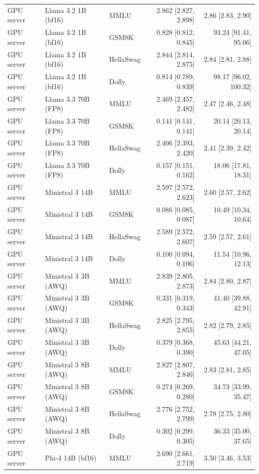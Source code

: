 \begin{longtable}{@{}l l l r r@{}}
GPU server & Llama 3.2 1B (bf16) & MMLU & 2.862 [2.827, 2.898] & 2.86 [2.83, 2.90] \\
GPU server & Llama 3.2 1B (bf16) & GSM8K & 0.828 [0.812, 0.845] & 93.24 [91.41, 95.06] \\
GPU server & Llama 3.2 1B (bf16) & HellaSwag & 2.844 [2.814, 2.875] & 2.84 [2.81, 2.88] \\
GPU server & Llama 3.2 1B (bf16) & Dolly & 0.814 [0.789, 0.839] & 98.17 [96.02, 100.32] \\
GPU server & Llama 3.3 70B (FP8) & MMLU & 2.469 [2.457, 2.482] & 2.47 [2.46, 2.48] \\
GPU server & Llama 3.3 70B (FP8) & GSM8K & 0.141 [0.141, 0.141] & 20.14 [20.13, 20.14] \\
GPU server & Llama 3.3 70B (FP8) & HellaSwag & 2.406 [2.393, 2.420] & 2.41 [2.39, 2.42] \\
GPU server & Llama 3.3 70B (FP8) & Dolly & 0.157 [0.151, 0.162] & 18.06 [17.81, 18.31] \\
GPU server & Ministral 3 14B & MMLU & 2.597 [2.572, 2.623] & 2.60 [2.57, 2.62] \\
GPU server & Ministral 3 14B & GSM8K & 0.086 [0.085, 0.087] & 10.49 [10.34, 10.64] \\
GPU server & Ministral 3 14B & HellaSwag & 2.589 [2.572, 2.607] & 2.59 [2.57, 2.61] \\
GPU server & Ministral 3 14B & Dolly & 0.100 [0.094, 0.106] & 11.54 [10.96, 12.13] \\
GPU server & Ministral 3 3B (AWQ) & MMLU & 2.839 [2.805, 2.873] & 2.84 [2.80, 2.87] \\
GPU server & Ministral 3 3B (AWQ) & GSM8K & 0.331 [0.319, 0.343] & 41.40 [39.88, 42.91] \\
GPU server & Ministral 3 3B (AWQ) & HellaSwag & 2.825 [2.795, 2.855] & 2.82 [2.79, 2.85] \\
GPU server & Ministral 3 3B (AWQ) & Dolly & 0.379 [0.368, 0.390] & 45.63 [44.21, 47.05] \\
GPU server & Ministral 3 8B (AWQ) & MMLU & 2.827 [2.807, 2.846] & 2.83 [2.81, 2.85] \\
GPU server & Ministral 3 8B (AWQ) & GSM8K & 0.274 [0.269, 0.280] & 34.73 [33.99, 35.47] \\
GPU server & Ministral 3 8B (AWQ) & HellaSwag & 2.776 [2.752, 2.799] & 2.78 [2.75, 2.80] \\
GPU server & Ministral 3 8B (AWQ) & Dolly & 0.302 [0.299, 0.305] & 36.33 [35.00, 37.65] \\
GPU server & Phi-4 14B (bf16) & MMLU & 2.690 [2.661, 2.719] & 3.50 [3.46, 3.53] \\

\end{longtable}
